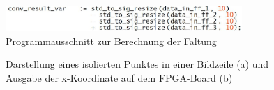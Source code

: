\documentclass[ngerman,12pt]{article} %
\begin{document}
{\begin{figure}[htbp]
	\begin{center}
	\includegraphics[width = 0.8\textwidth]{convolution_2_Ableitung}
	\caption[Programmausschnitt zur Berechnung der Faltung]{\label{pic:Programmausschnitt zur Berechnung der Faltung}Programmausschnitt zur Berechnung der Faltung}
	\end{center}
\end{figure}

\begin{figure}[h!tb]
  \centering
  \qquad
  \caption[Darstellung eines isolierten Punktes in einer Bildzeile und Ausgabe der x-Koordinate auf dem FPGA-Board]{\label{pic:isolierter_Punkt}Darstellung eines isolierten Punktes in einer Bildzeile (a) und Ausgabe der x-Koordinate auf dem FPGA-Board (b)}
\end{figure}

}
\end{document}
